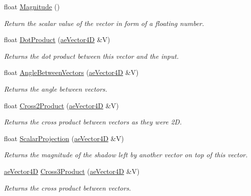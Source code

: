 \begin{DoxyCompactItemize}
\item 
float \hyperlink{structae_core_1_1ae_vector4_d_a743a5ffabb387940d255de7d54554136}{Magnitude} ()
\begin{DoxyCompactList}\small\item\em Return the scalar value of the vector in form of a floating number. \end{DoxyCompactList}\item 
float \hyperlink{structae_core_1_1ae_vector4_d_a36559e6853c772450b39ed629a258c6d}{Dot\+Product} (\hyperlink{structae_core_1_1ae_vector4_d}{ae\+Vector4D} \&V)
\begin{DoxyCompactList}\small\item\em Returns the dot product between this vector and the input. \end{DoxyCompactList}\item 
float \hyperlink{structae_core_1_1ae_vector4_d_a779255080a29042354aa5ac8450205cc}{Angle\+Between\+Vectors} (\hyperlink{structae_core_1_1ae_vector4_d}{ae\+Vector4D} \&V)
\begin{DoxyCompactList}\small\item\em Returns the angle between vectors. \end{DoxyCompactList}\item 
float \hyperlink{structae_core_1_1ae_vector4_d_a8d19c00005a706c38dc7aba4f2cb3b35}{Cross2\+Product} (\hyperlink{structae_core_1_1ae_vector4_d}{ae\+Vector4D} \&V)
\begin{DoxyCompactList}\small\item\em Returns the cross product between vectors as they were 2D. \end{DoxyCompactList}\item 
float \hyperlink{structae_core_1_1ae_vector4_d_a5b3e24e3b15f541c2978ea418ae1389e}{Scalar\+Projection} (\hyperlink{structae_core_1_1ae_vector4_d}{ae\+Vector4D} \&V)
\begin{DoxyCompactList}\small\item\em Returns the magnitude of the shadow left by another vector on top of this vector. \end{DoxyCompactList}\item 
\hyperlink{structae_core_1_1ae_vector4_d}{ae\+Vector4D} \hyperlink{structae_core_1_1ae_vector4_d_a50158f8798418effac753d5ba2248d13}{Cross3\+Product} (\hyperlink{structae_core_1_1ae_vector4_d}{ae\+Vector4D} \&V)
\begin{DoxyCompactList}\small\item\em Returns the cross product between vectors. \end{DoxyCompactList}\item 

\end{DoxyCompactItemize}
